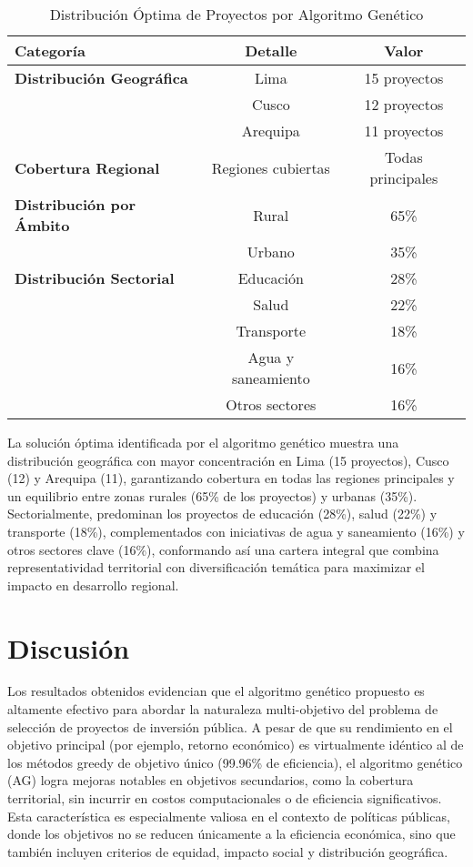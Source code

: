 \documentclass[12pt,a4paper]{article}
\begin{document}
\begin{table}[H]
\centering
\caption{Distribución Óptima de Proyectos por Algoritmo Genético}
\label{tab:distribucion_optima}
\begin{tabular}{@{}lcc@{}}
\toprule
\textbf{Categoría} & \textbf{Detalle} & \textbf{Valor} \\
\midrule
\textbf{Distribución Geográfica} & Lima & 15 proyectos \\
 & Cusco & 12 proyectos \\
 & Arequipa & 11 proyectos \\
\midrule
\textbf{Cobertura Regional} & Regiones cubiertas & Todas principales \\
\midrule
\textbf{Distribución por Ámbito} & Rural & 65\% \\
 & Urbano & 35\% \\
\midrule
\textbf{Distribución Sectorial} & Educación & 28\% \\
 & Salud & 22\% \\
 & Transporte & 18\% \\
 & Agua y saneamiento & 16\% \\
 & Otros sectores & 16\% \\
\bottomrule
\end{tabular}
\end{table}




La solución óptima identificada por el algoritmo genético muestra una distribución geográfica con mayor concentración en Lima (15 proyectos), Cusco (12) y Arequipa (11), garantizando cobertura en todas las regiones principales y un equilibrio entre zonas rurales (65\% de los proyectos) y urbanas (35\%). Sectorialmente, predominan los proyectos de educación (28\%), salud (22\%) y transporte (18\%), complementados con iniciativas de agua y saneamiento (16\%) y otros sectores clave (16\%), conformando así una cartera integral que combina representatividad territorial con diversificación temática para maximizar el impacto en desarrollo regional.

\section{Discusión}


Los resultados obtenidos evidencian que el algoritmo genético propuesto es altamente efectivo para abordar la naturaleza multi-objetivo del problema de selección de proyectos de inversión pública. A pesar de que su rendimiento en el objetivo principal (por ejemplo, retorno económico) es virtualmente idéntico al de los métodos greedy de objetivo único (99.96\% de eficiencia), el algoritmo genético (AG) logra mejoras notables en objetivos secundarios, como la cobertura territorial, sin incurrir en costos computacionales o de eficiencia significativos. Esta característica es especialmente valiosa en el contexto de políticas públicas, donde los objetivos no se reducen únicamente a la eficiencia económica, sino que también incluyen criterios de equidad, impacto social y distribución geográfica.
\end{document}
